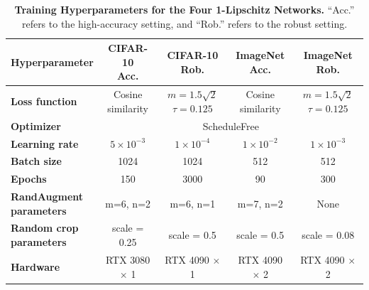     
    \begin{table}[h]
    \centering
    \small
    \renewcommand{\arraystretch}{1.2}
    \begin{tabular}{lcccc}
        \hline
        \textbf{Hyperparameter} 
        & \makecell{\textbf{CIFAR-10}\\\textbf{Acc.}} 
        & \makecell{\textbf{CIFAR-10}\\\textbf{Rob.}} 
        & \makecell{\textbf{ImageNet}\\\textbf{Acc.}} 
        & \makecell{\textbf{ImageNet}\\\textbf{Rob.}} 
        \\
        \hline
        \textbf{Loss function} 
        & Cosine similarity 
        & \makecell{\cite{prach_almost-orthogonal_2022} \\ $m= 1.5\sqrt{2}$ \\ $\tau=0.125$} 
        & Cosine similarity 
        & \makecell{\cite{prach_almost-orthogonal_2022} \\ $m= 1.5\sqrt{2}$ \\ $\tau=0.125$} 
        \\
        \textbf{Optimizer} 
        & \multicolumn{4}{c}{ScheduleFree \cite{defazio2024roadscheduled}} 
        \\
        \textbf{Learning rate} 
        & $5 \times 10^{-3}$ 
        & $1 \times 10^{-4}$ 
        & $1 \times 10^{-2}$ 
        & $1 \times 10^{-3}$ 
        \\
        \textbf{Batch size} 
        & 1024 
        & 1024 
        & 512 
        & 512
        \\
        \textbf{Epochs}
        & 150 
        & 3000 
        & 90
        & 300
        \\
        \makecell[l]{\textbf{RandAugment}\\\textbf{parameters}} 
        & m=6, n=2
        & m=6, n=1
        & m=7, n=2  
        & None
        \\
        \makecell[l]{\textbf{Random crop}\\\textbf{parameters}} 
        & scale = 0.25
        & scale = 0.5
        & scale = 0.5
        & scale = 0.08
        \\
        \textbf{Hardware} 
        & RTX 3080 $\times$ 1
        & RTX 4090 $\times$ 1
        & RTX 4090 $\times$ 2
        & RTX 4090 $\times$ 2
        \\
        \hline
    \end{tabular}
    \caption{\textbf{Training Hyperparameters for the Four 1-Lipschitz Networks.} 
    ``Acc.'' refers to the high-accuracy setting, and 
    ``Rob.'' refers to the robust setting.}
    \label{tab:hyperparams}
\end{table}


